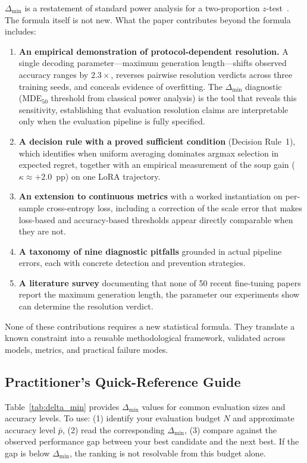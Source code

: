 \documentclass[pdflatex,sn-mathphys-ay,iicol]{sn-jnl}
\theoremstyle{thmstylethree}
\begin{document}
\begin{table}[t]
$\Delta_{\min}$ is a restatement of standard power analysis for a two-proportion $z$-test~\citep{cohen1988statistical}. The formula itself is not new. What the paper contributes beyond the formula includes:

\begin{enumerate}
    \item \textbf{An empirical demonstration of protocol-dependent resolution.} A single decoding parameter---maximum generation length---shifts observed accuracy ranges by $2.3\times$, reverses pairwise resolution verdicts across three training seeds, and conceals evidence of overfitting. The $\Delta_{\min}$ diagnostic (MDE$_{50}$ threshold from classical power analysis) is the tool that reveals this sensitivity, establishing that evaluation resolution claims are interpretable only when the evaluation pipeline is fully specified.
    \item \textbf{A decision rule with a proved sufficient condition} (Decision Rule~1), which identifies when uniform averaging dominates argmax selection in expected regret, together with an empirical measurement of the soup gain ($\kappa\approx+2.0$~pp) on one LoRA trajectory.
    \item \textbf{An extension to continuous metrics} with a worked instantiation on per-sample cross-entropy loss, including a correction of the scale error that makes loss-based and accuracy-based thresholds appear directly comparable when they are not.
    \item \textbf{A taxonomy of nine diagnostic pitfalls} grounded in actual pipeline errors, each with concrete detection and prevention strategies.
    \item \textbf{A literature survey} documenting that none of 50 recent fine-tuning papers report the maximum generation length, the parameter our experiments show can determine the resolution verdict.
\end{enumerate}


None of these contributions requires a new statistical formula. They translate a known constraint into a reusable methodological framework, validated across models, metrics, and practical failure modes.

\subsection{Practitioner's Quick-Reference Guide}

Table~\ref{tab:delta_min} provides $\Delta_{\min}$ values for common evaluation sizes and accuracy levels. To use: (1) identify your evaluation budget $N$ and approximate accuracy level $\bar{p}$, (2) read the corresponding $\Delta_{\min}$, (3) compare against the observed performance gap between your best candidate and the next best. If the gap is below $\Delta_{\min}$, the ranking is not resolvable from this budget alone.


\end{table}
\end{document}

